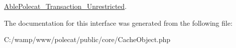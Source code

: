\hyperlink{class_able_polecat___transaction___unrestricted_a3f2135f6ad45f51d075657f6d20db2cd}{Able\+Polecat\+\_\+\+Transaction\+\_\+\+Unrestricted}.



The documentation for this interface was generated from the following file\+:\begin{DoxyCompactItemize}
\item 
C\+:/wamp/www/polecat/public/core/Cache\+Object.\+php\end{DoxyCompactItemize}
